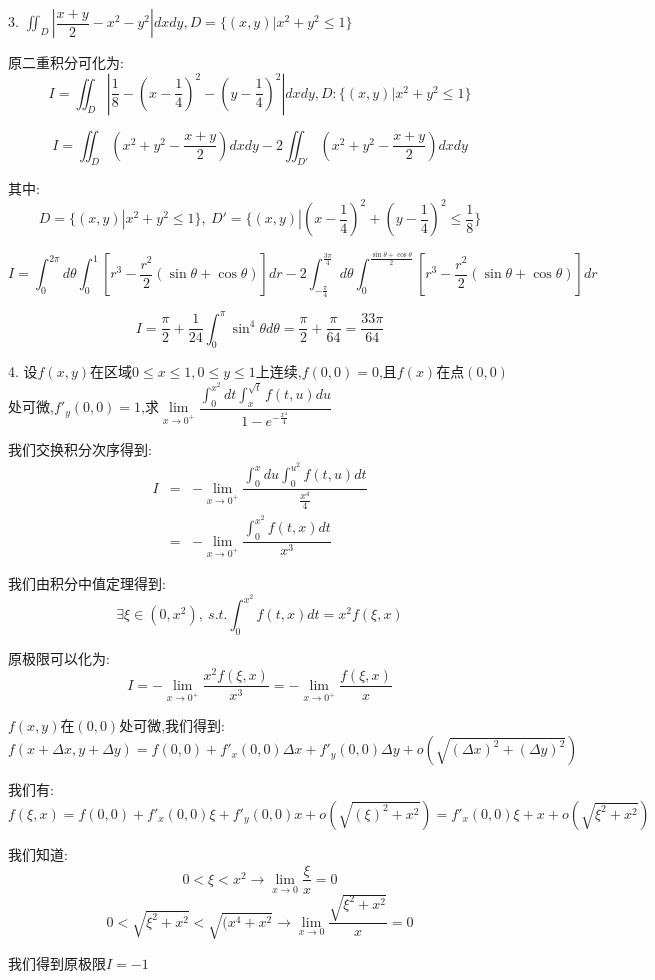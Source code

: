 3. $\iint_{D}|\dfrac{x+y}{2}-x^2-y^2|dxdy,D=\{(x,y)|x^2+y^2\leq 1\}$
\begin{solution}
	
	原二重积分可化为: 
	$$I=\iint_{D}|\dfrac{1}{8}-(x-\dfrac{1}{4})^2-(y-\dfrac{1}{4})^2|dxdy,D:\{(x,y)|x^2+y^2\leq 1\}$$
	
	$$I=\iint_{D}(x^2+y^2-\dfrac{x+y}{2})dxdy-2\iint_{D'}(x^2+y^2-\dfrac{x+y}{2})dxdy$$
	
	其中: $$D=\{(x,y)|x^2+y^2\leq 1\},\ D'=\{(x,y)|(x-\frac{1}{4})^2+(y-\frac{1}{4})^2\leq \frac{1}{8}\}$$
	
	$$I=\int_{0}^{2\pi}d\theta\int_{0}^{1}[r^3-\frac{r^2}{2}(\sin\theta+\cos\theta)]dr-2\int_{-\frac{\pi}{4}}^{\frac{3\pi}{4}}d\theta\int_{0}^{\frac{\sin\theta+\cos\theta}{2}}[r^3-\frac{r^2}{2}(\sin\theta+\cos\theta)]dr$$
	
	$$I=\frac{\pi}{2}+\frac{1}{24}\int_{0}^{\pi}\sin^4\theta d\theta=\frac{\pi}{2}+\frac{\pi}{64}=\frac{33\pi}{64}$$
\end{solution}


4. 设$f(x,y)$在区域$0\leq x\leq 1,0\leq y\leq 1$上连续,$f(0,0)=0$,且$f(x)$在点$(0,0)$处可微,$f'_{y}(0,0)=1$,求$\lim\limits_{x\rightarrow 0^{+}}\dfrac{\int_{0}^{x^2}dt\int_{x}^{\sqrt{t}}f(t,u)du}{1-e^{-\frac{x^4}{4}}}$
\begin{solution}
	
	我们交换积分次序得到: 
	\begin{eqnarray*}
		I&=&-\lim\limits_{x\rightarrow 0^{+}}\dfrac{\int_{0}^{x}du\int_{0}^{u^2}f(t,u)dt}{\frac{x^4}{4}}\\
		&=&-\lim\limits_{x\rightarrow 0^{+}}\dfrac{\int_{0}^{x^2}f(t,x)dt}{x^3}
	\end{eqnarray*}
	
	我们由积分中值定理得到: 
	$$\exists \xi\in(0,x^2),\ s.t. \int_{0}^{x^2}f(t,x)dt=x^2f(\xi,x)$$
	
	原极限可以化为: 
	$$I=-\lim\limits_{x\rightarrow 0^{+}}\dfrac{x^2f(\xi,x)}{x^3}=-\lim\limits_{x\rightarrow 0^{+}}\dfrac{f(\xi,x)}{x}$$
	
	$f(x,y)$在$(0,0)$处可微,我们得到: 
	$$f(x+\Delta x,y+\Delta y)=f(0,0)+f'_{x}(0,0)\Delta x+f'_{y}(0,0)\Delta y+o(\sqrt{(\Delta x)^2+(\Delta y)^2})$$
	
	我们有: 
	$$f(\xi,x)=f(0,0)+f'_{x}(0,0)\xi+f'_{y}(0,0)x+o(\sqrt{(\xi)^2+x^2})=f'_{x}(0,0)\xi+x+o(\sqrt{\xi^2+x^2})$$
	
	我们知道: 
	$$0<\xi<x^2\rightarrow \lim\limits_{x\rightarrow 0}\dfrac{\xi}{x}=0$$
	$$0<\sqrt{\xi^2+x^2}<\sqrt{(x^4+x^2}\rightarrow \lim\limits_{x\rightarrow 0}\dfrac{\sqrt{\xi^2+x^2}}{x}=0 $$
	
	我们得到原极限$I=-1$
\end{solution}

